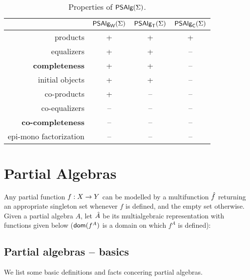 \documentclass[10pt]{article}
\begin{document}
\begin{table}[htb] 
\begin{center}
\begin{tabular}{|r|c|c|c|}
\hline
    & $\mbox{\sf PSAlg}_{\sf W}(\Sigma)$ & $\mbox{\sf PSAlg}_{\sf T}(\Sigma)$ & $\mbox{\sf PSAlg}_{\sf C}(\Sigma)$ \\ \hline
products       &+ & +   & + \\
equalizers     &+ & +   & -- \\
{\bf completeness} &+ & +   & -- \\ \hline
initial objects  &+  & +  & -- \\
co-products    &+ & --  & -- \\
co-equalizers  &-- & --  & -- \\
{\bf co-completeness}&-- & -- & -- \\ \hline
epi-mono factorization   &-- & --   & -- \\ \hline
\end{tabular}
\caption{Properties of $\mbox{\sf PSAlg}(\Sigma)$.}\label{tab:B}
\end{center}
\end{table}



\section{Partial Algebras}
\label{se:pa}

Any partial function $f : X \rightarrow Y$ can be modelled by a
multifunction $\hat{f}$ returning an appropriate singleton set whenever
$f$ is defined, and the empty set
otherwise. Given a partial algebra $A$, let $\hat{A}$ be its
multialgebraic representation with functions given below ($\mbox{\sf dom}(f^A)$ is
a domain on which $f^A$ is defined):  


\subsection{Partial algebras -- basics}

We list some basic definitions and facts concering partial algebras.

\end{document}
